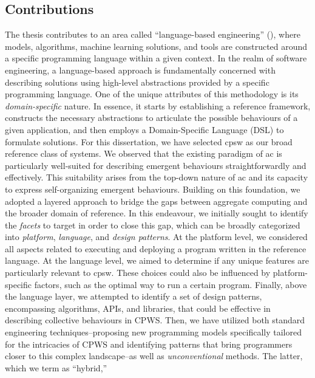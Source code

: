 \begin{refsection}
\subsection*{Contributions}

The thesis contributes to an area called ``language-based engineering'' (), where models, algorithms, machine learning solutions, and tools are constructed around a specific programming language within a given context.
In the realm of software engineering, 
 a language-based approach is fundamentally concerned with describing solutions using high-level abstractions provided by a specific programming language. 
 One of the unique attributes of this methodology is its \emph{domain-specific} nature. 
 In essence, it starts by establishing a reference framework, 
 constructs the necessary abstractions to articulate the possible behaviours of a given application, 
 and then employs a Domain-Specific Language (DSL) to formulate solutions.
%
For this dissertation, 
 we have selected \ac{cpsw} as our broad reference class of systems. 
 We observed that the existing paradigm of \acf{ac} 
 is particularly well-suited for describing emergent behaviours straightforwardly and effectively. This suitability arises from the top-down nature of \ac{ac} and its capacity to express self-organizing emergent behaviours.
%
Building on this foundation, 
 we adopted a layered approach to bridge the gaps between aggregate computing and the broader domain of reference. 
 In this endeavour, 
 we initially sought to identify the \emph{facets} to target in order to close this gap, 
 which can be broadly categorized into \emph{platform}, \emph{language}, and \emph{design patterns}. 
 At the platform level, 
 we considered all aspects related to executing and deploying a program written in the reference language. 
 At the language level, we aimed to determine if any unique features are particularly relevant to \ac{cpsw}. 
 These choices could also be influenced by platform-specific factors, 
 such as the optimal way to run a certain program. 
 Finally, above the language layer, 
 we attempted to identify a set of design patterns, encompassing algorithms, APIs, and libraries, 
 that could be effective in describing collective behaviours in CPWS.
 Then, we have utilized both standard engineering techniques--proposing new programming models specifically tailored for the intricacies of CPWS and identifying patterns that bring programmers closer to this complex landscape--as well as \emph{unconventional} methods. 
 The latter, which we term as ``hybrid,'' 

\end{refsection}

